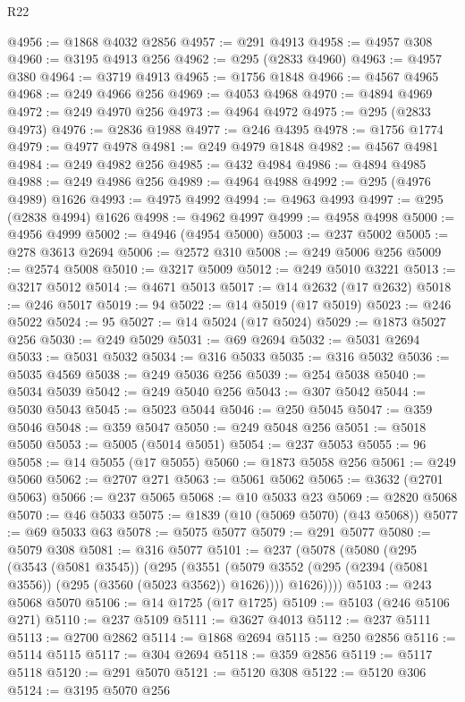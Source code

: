 \begin{lexlean}{R22}
\begin{coremodule}
@4956 := @1868 @4032 @2856
@4957 := @291 @4913
@4958 := @4957 @308
@4960 := @3195 @4913 @256
@4962 := @295 (@2833 @4960)
@4963 := @4957 @380
@4964 := @3719 @4913
@4965 := @1756 @1848
@4966 := @4567 @4965
@4968 := @249 @4966 @256
@4969 := @4053 @4968
@4970 := @4894 @4969
@4972 := @249 @4970 @256
@4973 := @4964 @4972
@4975 := @295 (@2833 @4973)
@4976 := @2836 @1988
@4977 := @246 @4395
@4978 := @1756 @1774
@4979 := @4977 @4978
@4981 := @249 @4979 @1848
@4982 := @4567 @4981
@4984 := @249 @4982 @256
@4985 := @432 @4984
@4986 := @4894 @4985
@4988 := @249 @4986 @256
@4989 := @4964 @4988
@4992 := @295 (@4976 @4989) @1626
@4993 := @4975 @4992
@4994 := @4963 @4993
@4997 := @295 (@2838 @4994) @1626
@4998 := @4962 @4997
@4999 := @4958 @4998
@5000 := @4956 @4999
@5002 := @4946 (@4954 @5000)
@5003 := @237 @5002
@5005 := @278 @3613 @2694
@5006 := @2572 @310
@5008 := @249 @5006 @256
@5009 := @2574 @5008
@5010 := @3217 @5009
@5012 := @249 @5010 @3221
@5013 := @3217 @5012
@5014 := @4671 @5013
@5017 := @14 @2632 (@17 @2632)
@5018 := @246 @5017
@5019 := 94
@5022 := @14 @5019 (@17 @5019)
@5023 := @246 @5022
@5024 := 95
@5027 := @14 @5024 (@17 @5024)
@5029 := @1873 @5027 @256
@5030 := @249 @5029
@5031 := @69 @2694
@5032 := @5031 @2694
@5033 := @5031 @5032
@5034 := @316 @5033
@5035 := @316 @5032
@5036 := @5035 @4569
@5038 := @249 @5036 @256
@5039 := @254 @5038
@5040 := @5034 @5039
@5042 := @249 @5040 @256
@5043 := @307 @5042
@5044 := @5030 @5043
@5045 := @5023 @5044
@5046 := @250 @5045
@5047 := @359 @5046
@5048 := @359 @5047
@5050 := @249 @5048 @256
@5051 := @5018 @5050
@5053 := @5005 (@5014 @5051)
@5054 := @237 @5053
@5055 := 96
@5058 := @14 @5055 (@17 @5055)
@5060 := @1873 @5058 @256
@5061 := @249 @5060
@5062 := @2707 @271
@5063 := @5061 @5062
@5065 := @3632 (@2701 @5063)
@5066 := @237 @5065
@5068 := @10 @5033 @23
@5069 := @2820 @5068
@5070 := @46 @5033
@5075 := @1839 (@10 (@5069 @5070) (@43 @5068))
@5077 := @69 @5033 @63
@5078 := @5075 @5077
@5079 := @291 @5077
@5080 := @5079 @308
@5081 := @316 @5077
@5101 := @237
    (@5078
      (@5080
        (@295
          (@3543 (@5081 @3545))
          (@295
            (@3551 (@5079 @3552 (@295 (@2394 (@5081 @3556)) (@295 (@3560 (@5023 @3562)) @1626))))
            @1626))))
@5103 := @243 @5068 @5070
@5106 := @14 @1725 (@17 @1725)
@5109 := @5103 (@246 @5106 @271)
@5110 := @237 @5109
@5111 := @3627 @4013
@5112 := @237 @5111
@5113 := @2700 @2862
@5114 := @1868 @2694
@5115 := @250 @2856
@5116 := @5114 @5115
@5117 := @304 @2694
@5118 := @359 @2856
@5119 := @5117 @5118
@5120 := @291 @5070
@5121 := @5120 @308
@5122 := @5120 @306
@5124 := @3195 @5070 @256

\end{coremodule}
\end{lexlean}
